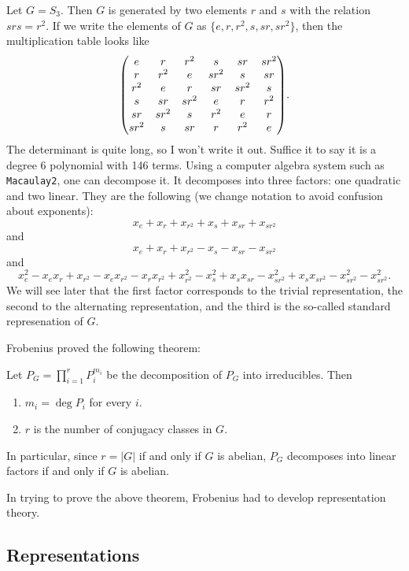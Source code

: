 \documentclass[11pt, english]{article}
\begin{document}
\begin{example}
Let $G=S_3$. Then $G$ is generated by two elements $r$ and $s$ with the relation $srs=r^2$. If we write the elements of $G$ as $\{e,r,r^2,s,sr,sr^2\}$, then the multiplication table looks like
 $$ \bgroup\begin{pmatrix}
e&     r&     r^2&     s&     sr&     sr^2\\
     r&    r^2&     e&    sr^2&     s&     sr\\ 
    r^2&     e&     r&     sr&     sr^2&     s\\ 
    s&     sr&    sr^2&     e&     r&    r^2\\ 
    sr&     sr^2&     s&    r^2&    e&     r\\
  sr^2&     s&   sr&     r&    r^2&     e\\
     \end{pmatrix}\egroup.$$
The determinant is quite long, so I won't write it out. Suffice it to say it is a degree $6$ polynomial with 146 terms. Using a computer algebra system such as \verb|Macaulay2|, one can decompose it. It decomposes into three factors: one quadratic and two linear. They are the following (we change notation to avoid confusion about exponents):
\[
x_e+x_r+x_{r^2}+x_s+x_{sr}+x_{sr^2}
\]
and 
\[
x_e+x_r+x_{r^2}-x_s-x_{sr}-x_{sr^2}
\]
and 
\[
x_e^2-x_ex_r+x_{r^2}-x_e x_{r^2}-x_r x_{r^2} + x_{r^2}^2-x_s^2+x_s x_{sr} - x_{sr^2}^2 + x_s x_{sr^2}-x_{sr^2}^2-x_{sr^2}^2.
\]
We will see later that the first factor corresponds to the trivial representation, the second to the alternating representation, and the third is the so-called standard represenation of $G$.
\end{example}
Frobenius proved the following theorem:
\begin{thm}
  Let $P_G= \prod_{i=1}^r P_i^{m_i}$ be the decomposition of $P_G$ into irreducibles. Then
  \begin{enumerate}
  \item $m_i=\deg P_i$ for every $i$.
\item $r$ is the number of conjugacy classes in $G$. 
  \end{enumerate}
In particular, since $r=\lvert G \rvert $ if and only if $G$ is abelian, $P_G$ decomposes into linear factors if and only if $G$ is abelian.
\end{thm}

In trying to prove the above theorem, Frobenius had to develop representation theory.

\subsection{Representations}
\end{document}
